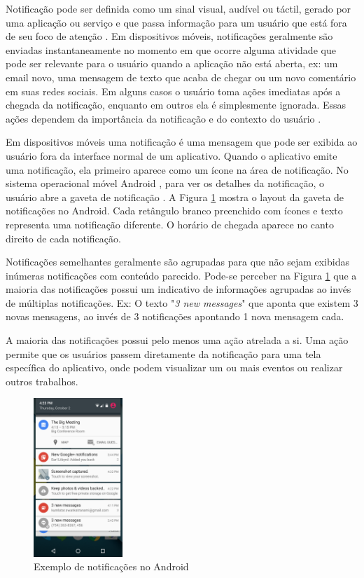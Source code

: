Notificação pode ser definida como um sinal visual, audível ou táctil, gerado por uma aplicação
ou serviço e que passa informação para um usuário que está fora de seu foco de atenção \cite{iqbal2010notifications}.
Em dispositivos móveis, notificações geralmente são enviadas instantaneamente no momento em que ocorre alguma atividade que pode ser relevante
para o usuário quando a aplicação não está aberta, ex: um email novo, uma mensagem de texto que acaba de chegar ou um
novo comentário em suas redes sociais. Em alguns casos o usuário toma ações imediatas após a chegada da notificação,
enquanto em outros ela é simplesmente ignorada. Essas ações dependem da importância da notificação e do contexto do
usuário \cite{sahami2014large}.

Em dispositivos móveis uma notificação é uma mensagem que pode ser exibida ao usuário fora da interface normal de um aplicativo.
Quando o aplicativo emite uma notificação, ela primeiro aparece como um ícone na área de notificação. No sistema operacional móvel
Android \cite{android}, para ver os detalhes da notificação, o usuário abre a gaveta de notificação \cite{notificationDrawer}. A Figura
\ref{notification-drawer} mostra o layout da gaveta de notificações no Android. Cada retângulo branco preenchido com ícones
e texto representa uma notificação diferente. O horário de chegada aparece no canto direito de cada notificação.

Notificações semelhantes geralmente são agrupadas para que não sejam exibidas inúmeras notificações com conteúdo parecido.
Pode-se perceber na Figura \ref{notification-drawer} que a maioria das notificações possui um indicativo de informações agrupadas
ao invés de múltiplas notificações. Ex: O texto "\textit{3 new messages}" que aponta que existem 3 novas mensagens, ao invés de 3
notificações apontando 1 nova mensagem cada.

A maioria das notificações possui pelo menos uma ação atrelada a si. Uma ação permite que os usuários passem
diretamente da notificação para uma tela específica do aplicativo, onde podem visualizar um ou mais eventos ou realizar
outros trabalhos.

\begin{figure}[h]
\centering
\includegraphics[width=0.3\textwidth]{images/notification_drawer.png}
\caption{Exemplo de notificações no Android \cite{notificationDrawer}}
\label{notification-drawer}
\end{figure}

